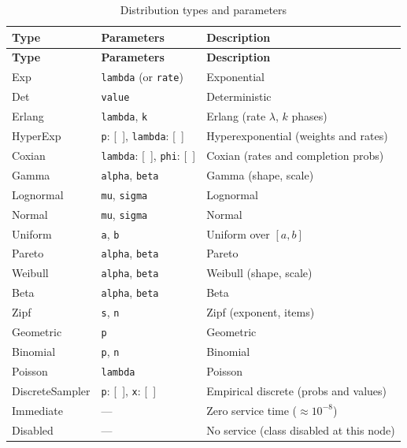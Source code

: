 \begin{footnotesize}
\begin{longtable}{|T{2.5cm}|T{5.0cm}|D{5.4cm}|}
\caption{Distribution types and parameters}\label{tab:json-dist}
\\\hline
\textbf{Type} & \textbf{Parameters} & \textbf{Description} \\\hline
\endfirsthead
\hline \textbf{Type} & \textbf{Parameters} & \textbf{Description} \\\hline
\endhead
\hline
\endfoot
Exp     & \texttt{lambda} (or \texttt{rate}) & Exponential \\\hline
Det     & \texttt{value}            & Deterministic \\\hline
Erlang  & \texttt{lambda}, \texttt{k}     & Erlang (rate $\lambda$, $k$ phases) \\\hline
HyperExp & \texttt{p}: [~], \texttt{lambda}: [~] & Hyperexponential (weights and rates) \\\hline
Coxian  & \texttt{lambda}: [~], \texttt{phi}: [~] & Coxian (rates and completion probs) \\\hline
Gamma   & \texttt{alpha}, \texttt{beta}   & Gamma (shape, scale) \\\hline
Lognormal & \texttt{mu}, \texttt{sigma}   & Lognormal \\\hline
Normal  & \texttt{mu}, \texttt{sigma}     & Normal \\\hline
Uniform & \texttt{a}, \texttt{b}           & Uniform over $[a,b]$ \\\hline
Pareto  & \texttt{alpha}, \texttt{beta}   & Pareto \\\hline
Weibull & \texttt{alpha}, \texttt{beta}   & Weibull (shape, scale) \\\hline
Beta    & \texttt{alpha}, \texttt{beta}   & Beta \\\hline
Zipf    & \texttt{s}, \texttt{n}           & Zipf (exponent, items) \\\hline
Geometric & \texttt{p}                    & Geometric \\\hline
Binomial & \texttt{p}, \texttt{n}          & Binomial \\\hline
Poisson & \texttt{lambda}                 & Poisson \\\hline
DiscreteSampler & \texttt{p}: [~], \texttt{x}: [~] & Empirical discrete (probs and values) \\\hline
Immediate & ---                           & Zero service time ($\approx 10^{-8}$) \\\hline
Disabled & ---                            & No service (class disabled at this node) \\\hline
\end{longtable}
\end{footnotesize}

